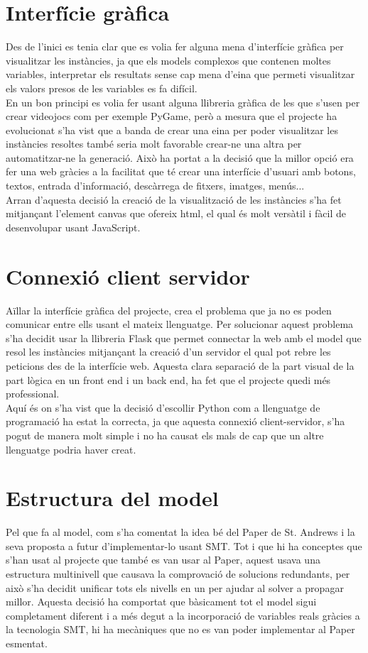 \section{Interfície gràfica}
Des de l'inici es tenia clar que es volia fer alguna mena d'interfície gràfica per visualitzar les instàncies, ja que els models complexos que contenen moltes variables, interpretar els resultats sense cap mena d'eina que permeti visualitzar els valors presos de les variables es fa difícil.\\
En un bon principi es volia fer usant alguna llibreria gràfica de les que s'usen per crear videojocs com per exemple PyGame, però a mesura que el projecte ha evolucionat s'ha vist que a banda de crear una eina per poder visualitzar les instàncies resoltes també seria molt favorable crear-ne una altra per automatitzar-ne la generació. Això ha portat a la decisió que la millor opció era fer una web gràcies a la facilitat que té crear una interfície d'usuari amb botons, textos, entrada d'informació, descàrrega de fitxers, imatges, menús...\\
Arran d'aquesta decisió la creació de la visualització de les instàncies s'ha fet mitjançant l'element canvas que ofereix html, el qual és molt versàtil i fàcil de desenvolupar usant JavaScript.\\

\section{Connexió client servidor}
Aïllar la interfície gràfica del projecte, crea el problema que ja no es poden comunicar entre ells usant el mateix llenguatge. Per solucionar aquest problema s'ha decidit usar la llibreria Flask que permet connectar la web amb el model que resol les instàncies mitjançant la creació d'un servidor el qual pot rebre les peticions des de la interfície web. Aquesta clara separació de la part visual de la part lògica en un front end i un back end, ha fet que el projecte quedi més professional.\\
Aquí és on s'ha vist que la decisió d'escollir Python com a llenguatge de programació ha estat la correcta, ja que aquesta connexió client-servidor, s'ha pogut de manera molt simple i no ha causat els mals de cap que un altre llenguatge podria haver creat.

\section{Estructura del model}
Pel que fa al model, com s'ha comentat la idea bé del Paper de St. Andrews i la seva proposta a futur d'implementar-lo usant SMT. Tot i que hi ha conceptes que s'han usat al projecte que també es van usar al Paper, aquest usava una estructura multinivell que causava la comprovació de solucions redundants, per això s'ha decidit unificar tots els nivells en un per ajudar al solver a propagar millor. Aquesta decisió ha comportat que bàsicament tot el model sigui completament diferent i a més degut a la incorporació de variables reals gràcies a la tecnologia SMT, hi ha mecàniques que no es van poder implementar al Paper esmentat.\\

